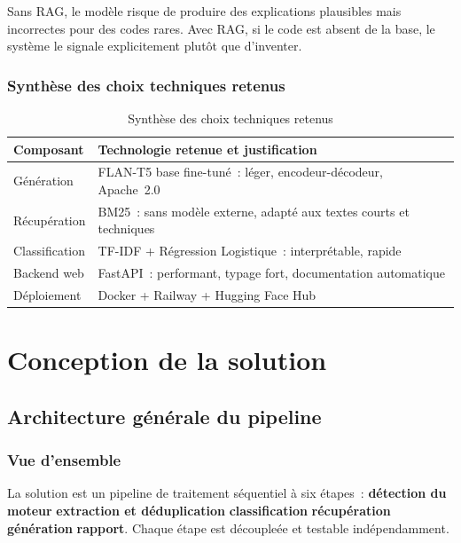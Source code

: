 \documentclass[12pt,a4paper]{report}
\begin{document}
Sans RAG, le mod\`ele risque de produire des explications plausibles mais incorrectes
pour des codes rares. Avec RAG, si le code est absent de la base, le syst\`eme le
signale explicitement plut\^ot que d'inventer.

\subsection{Synth\`ese des choix techniques retenus}

\begin{table}[H]
  \centering
  \caption{Synth\`ese des choix techniques retenus}
  \label{tab:choix_techniques}
  \begin{tabularx}{\textwidth}{lX}
    \toprule
    \textbf{Composant} & \textbf{Technologie retenue et justification} \\
    \midrule
    G\'en\'eration   & FLAN-T5 base fine-tun\'e~: l\'eger, encodeur-d\'ecodeur, Apache~2.0 \\
    R\'ecup\'eration & BM25~: sans mod\`ele externe, adapt\'e aux textes courts et techniques \\
    Classification   & TF-IDF + R\'egression Logistique~: interpr\'etable, rapide \\
    Backend web      & FastAPI~: performant, typage fort, documentation automatique \\
    D\'eploiement    & Docker + Railway + Hugging Face Hub \\
    \bottomrule
  \end{tabularx}
\end{table}

\chapter{Conception de la solution}

\section{Architecture g\'en\'erale du pipeline}

\subsection{Vue d'ensemble}

La solution est un pipeline de traitement s\'equentiel \`a six \'etapes~:
\textbf{d\'etection du moteur} \textrightarrow{} \textbf{extraction et d\'eduplication}
\textrightarrow{} \textbf{classification} \textrightarrow{} \textbf{r\'ecup\'eration}
\textrightarrow{} \textbf{g\'en\'eration} \textrightarrow{} \textbf{rapport}.
Chaque \'etape est d\'ecouple\'ee et testable ind\'ependamment.
\end{document}
